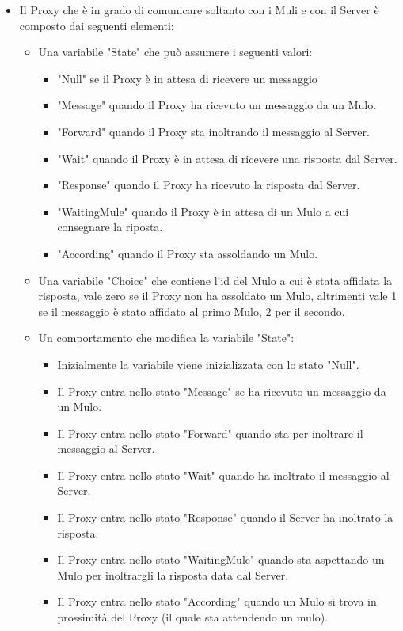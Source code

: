 \documentclass[13pt,a4paper]{article}
\begin{document}
\begin{itemize}
	
	\item Il Proxy che è in grado di comunicare soltanto con i Muli e con il Server è composto dai seguenti elementi: 
	\begin{itemize}
		\item Una variabile "State" che può assumere i seguenti valori:
		\begin{itemize}
			\item "Null" se il Proxy è in attesa di ricevere un messaggio
			\item "Message" quando il Proxy ha ricevuto un messaggio da un Mulo.
			\item "Forward" quando il Proxy sta inoltrando il messaggio al Server.
			\item "Wait" quando il Proxy è in attesa di ricevere una risposta dal Server.
			\item "Response" quando il Proxy ha ricevuto la risposta dal Server.
			\item "WaitingMule" quando il Proxy è in attesa di un Mulo a cui consegnare la riposta. 
			\item "According" quando il Proxy sta assoldando un Mulo.
		\end{itemize}
		\item Una variabile "Choice" che contiene l'id del Mulo a cui è stata affidata la risposta, vale zero se il Proxy non ha assoldato un Mulo, altrimenti vale 1 se il messaggio è stato affidato al primo Mulo, 2 per il secondo.
		\item Un comportamento che modifica la variabile "State":
		\begin{itemize}
			\item Inizialmente la variabile viene inizializzata con lo stato "Null".
			\item Il Proxy entra nello stato "Message" se ha ricevuto un messaggio da un Mulo.
			\item Il Proxy entra nello stato "Forward" quando sta per inoltrare il messaggio al Server.
			\item Il Proxy entra nello stato "Wait" quando ha inoltrato il messaggio al Server.
			\item Il Proxy entra nello stato "Response" quando il Server ha inoltrato la risposta.
			\item Il Proxy entra nello stato "WaitingMule" quando sta aspettando un Mulo per inoltrargli la risposta data dal Server.
			\item Il Proxy entra nello stato "According" quando un Mulo si trova in prossimità del Proxy (il quale sta attendendo un mulo).

\end{itemize}
\end{itemize}
\end{itemize}
\end{document}
